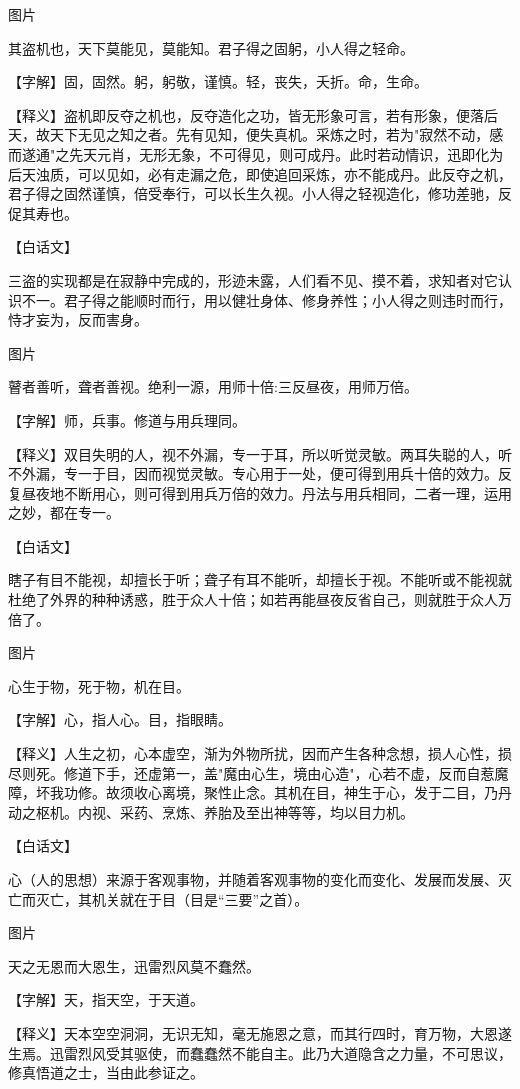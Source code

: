 \documentclass[12pt,UTF8]{ctexbook}
\begin{document}
图片​


其盗机也，天下莫能见，莫能知。君子得之固躬，小人得之轻命。


【字解】固，固然。躬，躬敬，谨慎。轻，丧失，夭折。命，生命。


【释义】盗机即反夺之机也，反夺造化之功，皆无形象可言，若有形象，便落后天，故天下无见之知之者。先有见知，便失真机。采炼之时，若为"寂然不动，感而遂通"之先天元肖，无形无象，不可得见，则可成丹。此时若动情识，迅即化为后天浊质，可以见如，必有走漏之危，即使追回采炼，亦不能成丹。此反夺之机，君子得之固然谨慎，倍受奉行，可以长生久视。小人得之轻视造化，修功差驰，反促其寿也。


【白话文】


三盗的实现都是在寂静中完成的，形迹未露，人们看不见、摸不着，求知者对它认识不一。君子得之能顺时而行，用以健壮身体、修身养性；小人得之则违时而行，恃才妄为，反而害身。


图片​


瞽者善听，聋者善视。绝利一源，用师十倍:三反昼夜，用师万倍。


【字解】师，兵事。修道与用兵理同。


【释义】双目失明的人，视不外漏，专一于耳，所以听觉灵敏。两耳失聪的人，听不外漏，专一于目，因而视觉灵敏。专心用于一处，便可得到用兵十倍的效力。反复昼夜地不断用心，则可得到用兵万倍的效力。丹法与用兵相同，二者一理，运用之妙，都在专一。


【白话文】


瞎子有目不能视，却擅长于听；聋子有耳不能听，却擅长于视。不能听或不能视就杜绝了外界的种种诱惑，胜于众人十倍；如若再能昼夜反省自己，则就胜于众人万倍了。

图片​


心生于物，死于物，机在目。


【字解】心，指人心。目，指眼睛。


【释义】人生之初，心本虚空，渐为外物所扰，因而产生各种念想，损人心性，损尽则死。修道下手，还虚第一，盖"魔由心生，境由心造"，心若不虚，反而自惹魔障，坏我功修。故须收心离境，聚性止念。其机在目，神生于心，发于二目，乃丹动之枢机。内视、采药、烹炼、养胎及至出神等等，均以目力机。


【白话文】


心（人的思想）来源于客观事物，并随着客观事物的变化而变化、发展而发展、灭亡而灭亡，其机关就在于目（目是“三要”之首）。


图片​


天之无恩而大恩生，迅雷烈风莫不蠢然。


【字解】天，指天空，于天道。


【释义】天本空空洞洞，无识无知，毫无施恩之意，而其行四时，育万物，大恩遂生焉。迅雷烈风受其驱使，而蠢蠢然不能自主。此乃大道隐含之力量，不可思议，修真悟道之士，当由此参证之。
\end{document}
